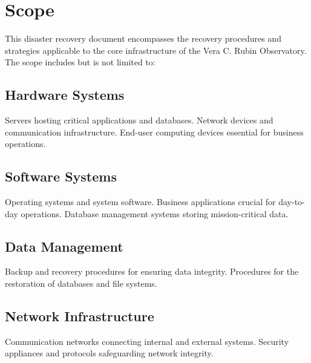 \section{Scope}

This disaster recovery document encompasses the recovery procedures and strategies applicable to the core infrastructure of the Vera C. Rubin Observatory. 
The scope includes but is not limited to:

\subsection{Hardware Systems}

Servers hosting critical applications and databases.
Network devices and communication infrastructure.
End-user computing devices essential for business operations.

\subsection{Software Systems}

Operating systems and system software.
Business applications crucial for day-to-day operations.
Database management systems storing mission-critical data.

\subsection{Data Management}

Backup and recovery procedures for ensuring data integrity.
Procedures for the restoration of databases and file systems.

\subsection{Network Infrastructure}

Communication networks connecting internal and external systems.
Security appliances and protocols safeguarding network integrity.

